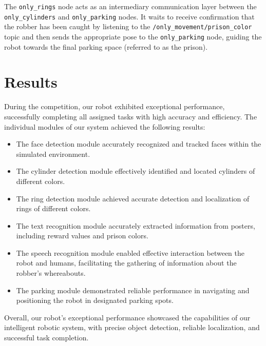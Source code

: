 \documentclass{article}
\begin{document}
The \texttt{only\_rings} node acts as an intermediary communication layer between the \texttt{only\_cylinders} and \texttt{only\_parking} nodes. It waits to receive confirmation that the robber has been caught by listening to the \texttt{/only\_movement/prison\_color} topic and then sends the appropriate pose to the \texttt{only\_parking} node, guiding the robot towards the final parking space (referred to as the prison).

\section{Results}

During the competition, our robot exhibited exceptional performance, successfully completing all assigned tasks with high accuracy and efficiency. The individual modules of our system achieved the following results:
\begin{itemize}
  \item The face detection module accurately recognized and tracked faces within the simulated environment.
  \item The cylinder detection module effectively identified and located cylinders of different colors.
  \item The ring detection module achieved accurate detection and localization of rings of different colors.
  \item The text recognition module accurately extracted information from posters, including reward values and prison colors.
  \item The speech recognition module enabled effective interaction between the robot and humans, facilitating the gathering of information about the robber's whereabouts.
  \item The parking module demonstrated reliable performance in navigating and positioning the robot in designated parking spots.
\end{itemize}
Overall, our robot's exceptional performance showcased the capabilities of our intelligent robotic system, with precise object detection, reliable localization, and successful task completion.
\end{document}
